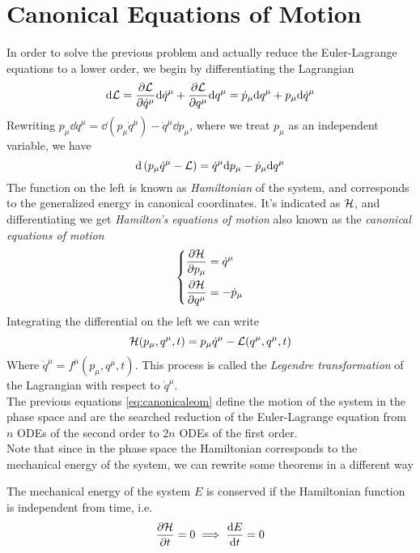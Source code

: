 \documentclass[../admech.tex]{subfiles}
\begin{document}
\section{Canonical Equations of Motion}
In order to solve the previous problem and actually reduce the Euler-Lagrange equations to a lower order, we begin by differentiating the Lagrangian
\begin{equation}
	\dd\mathcal{L}=\pdv{\mathcal{L}}{\dot{q}^\mu}\dd\dot{q}^\mu+\pdv{\mathcal{L}}{q^\mu}\dd q^\mu=\dot{p}_\mu\dd q^\mu+p_\mu\dd\dot{q}^\mu
	\label{eq:lagdiff}
\end{equation}
Rewriting $p_\mu\dd\dot{q}^\mu=\dd\left( p_\mu\dot{q}^\mu \right)-\dot{q}^\mu\dd p_\mu$, where we treat $p_\mu$ as an independent variable, we have
\begin{equation}
	\dd\left( p_\mu\dot{q}^\mu-\mathcal{L} \right)=\dot{q}^\mu\dd p_\mu-\dot{p}_\mu\dd q^\mu
	\label{eq:hamdiff1}
\end{equation}
The function on the left is known as \emph{Hamiltonian} of the system, and corresponds to the generalized energy in canonical coordinates. It's indicated as $\mathcal{H}$, and differentiating we get \textit{Hamilton's equations of motion} also known as the \textit{canonical equations of motion}
\begin{equation}
	\left\{ \begin{aligned}
			\pdv{\mathcal{H}}{p_\mu}&=\dot{q}^\mu\\
			\pdv{\mathcal{H}}{q^\mu}&=-\dot{p}_\mu
	\end{aligned}\right.
	\label{eq:canonicaleom}
\end{equation}
Integrating the differential on the left we can write
\begin{equation}
	\mathcal{H}(p_\mu,q^\mu,t)=p_\mu\dot{q}^\mu-\mathcal{L}(q^\mu,q^\mu,t)
	\label{eq:hamiltoniandef}
\end{equation}
Where $\dot{q}^\mu=f^\mu(p_\mu,q^\mu,t)$. This process is called the \emph{Legendre transformation} of the Lagrangian with respect to $\dot{q}^\mu$.\\
The previous equations \eqref{eq:canonicaleom} define the motion of the system in the phase space and are the searched reduction of the Euler-Lagrange equation from $n$ ODEs of the second order to $2n$ ODEs of the first order.\\
Note that since in the phase space the Hamiltonian corresponds to the mechanical energy of the system, we can rewrite some theorems in a different way
\begin{thm}
	The mechanical energy of the system $E$ is conserved if the Hamiltonian function is independent from time, i.e.
	\begin{equation*}
		\pdv{\mathcal{H}}{t}=0\implies\dv{E}{t}=0
	\end{equation*}
\end{thm}
\end{document}
